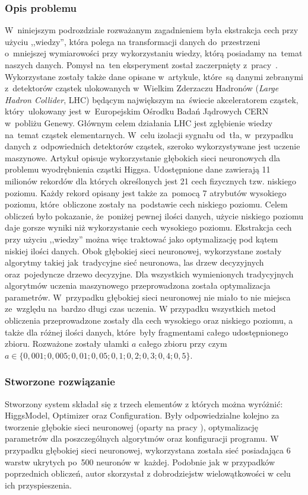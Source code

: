 \subsubsection{Opis problemu}
W~niniejszym podrozdziale rozważanym zagadnieniem była ekstrakcja cech przy użyciu ,,wiedzy'', która polega na transformacji danych do~przestrzeni o~mniejszej wymiarowości przy wykorzystaniu wiedzy, którą posiadamy na~temat naszych danych. Pomysł na~ten eksperyment został zaczerpnięty z~pracy~\cite{higgs1}. Wykorzystane zostały także dane opisane w~artykule, które~są danymi zebranymi z~detektorów cząstek ulokowanych w~Wielkim Zderzaczu Hadronów (\textit{Large Hadron Collider}, LHC) będącym największym na~świecie akceleratorem cząstek, który~ulokowany jest w~Europejskim Ośrodku Badań Jądrowych CERN w~pobliżu Genewy. Głównym celem działania LHC jest zgłębienie wiedzy na~temat cząstek elementarnych. W~celu izolacji sygnału od~tła, w~przypadku danych z~odpowiednich detektorów cząstek, szeroko wykorzystywane jest uczenie maszynowe. Artykuł opisuje wykorzystanie głębokich sieci neuronowych dla problemu wyodrębnienia cząstki Higgsa. Udostępnione dane zawierają 11 milionów rekordów dla których określonych jest 21 cech fizycznych tzw. niskiego poziomu. Każdy rekord opisany jest także za~pomocą 7 atrybutów wysokiego poziomu, które~obliczone zostały na~podstawie cech niskiego poziomu. Celem obliczeń było pokazanie, że~poniżej pewnej ilości danych, użycie niskiego poziomu daje gorsze wyniki niż wykorzystanie cech wysokiego poziomu. Ekstrakcja cech przy użyciu ,,wiedzy'' można więc traktować jako optymalizację pod kątem niskiej ilości danych. Obok głębokiej sieci neuronowej, wykorzystane zostały algorytmy takiej jak~tradycyjne sieć neuronowa, las drzew decyzyjnych oraz~pojedyncze drzewo decyzyjne. Dla wszystkich wymienionych tradycyjnych algorytmów uczenia maszynowego przeprowadzona została optymalizacja parametrów. W~przypadku głębokiej sieci neuronowej nie miało to nie miejsca ze~względu na~bardzo długi czas uczenia. W przypadku wszystkich metod obliczenia przeprowadzone zostały dla cech wysokiego oraz niskiego poziomu, a także dla różnej ilości danych, które~były fragmentami całego udostępnionego zbioru. Rozważone zostały ułamki $a$ całego zbioru przy czym $a\in\{0,001; 0,005; 0,01; 0,05; 0,1; 0,2; 0,3; 0,4; 0,5\}$. 

\subsubsection{Stworzone rozwiązanie}
Stworzony system składał się z trzech elementów z których można wyróżnić: HiggsModel, Optimizer oraz Configuration. Były odpowiedzialne kolejno za tworzenie głębokie sieci neuronowej (oparty na pracy \cite{higgs2}), optymalizację parametrów dla poszczególnych algorytmów oraz konfiguracji programu. W przypadku głębokiej sieci neuronowej, wykorzystana została sieć posiadająca 6 warstw ukrytych po~500 neuronów w~każdej. Podobnie jak w przypadków poprzednich obliczeń, autor skorzystał z dobrodziejstw wielowątkowości w celu ich przyspieszenia.


